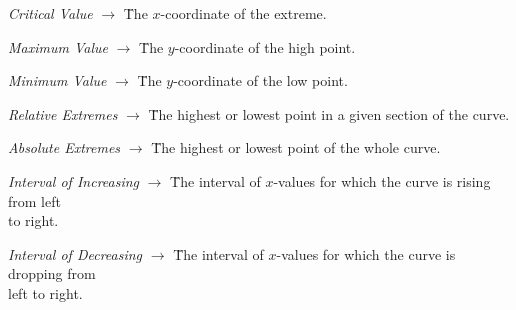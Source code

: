 \begin{tcolorbox}[definition]
    \begin{tabbing}
        \textit{Critical Value} $\rightarrow$ \= The $x$-coordinate of the extreme. 
    \end{tabbing} \vspace{11pt}
    \begin{tabbing}
        \textit{Maximum Value} $\rightarrow$ \= The $y$-coordinate of the high point. 
    \end{tabbing} \vspace{11pt}
    \begin{tabbing}
        \textit{Minimum Value} $\rightarrow$ \= The $y$-coordinate of the low point. 
    \end{tabbing} \vspace{11pt}
    \begin{tabbing}
        \textit{Relative Extremes} $\rightarrow$ \= The highest or lowest point in a given section of the curve. 
    \end{tabbing} \vspace{11pt}
    \begin{tabbing}
        \textit{Absolute Extremes} $\rightarrow$ \= The highest or lowest point of the whole curve. 
    \end{tabbing} \vspace{11pt}
    \begin{tabbing}
        \textit{Interval of Increasing} $\rightarrow$ \= The interval of $x$-values for which the curve is rising from left \\
        \> to right.
    \end{tabbing} \vspace{11pt}
    \begin{tabbing}
        \textit{Interval of Decreasing} $\rightarrow$ \= The interval of $x$-values for which the curve is dropping from \\
        \> left to right.
    \end{tabbing}
\end{tcolorbox}

\begin{center}
\end{center}

